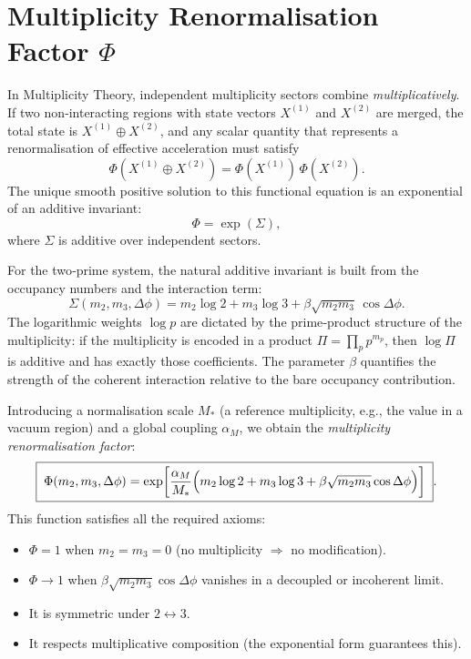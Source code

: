 \documentclass[11pt,a4paper]{article}
\theoremstyle{definition}
\theoremstyle{remark}
\begin{document}
\section{Multiplicity Renormalisation Factor $\Phi$}
In Multiplicity Theory, independent multiplicity sectors combine \textit{multiplicatively}. If two non‑interacting regions with state vectors $X^{(1)}$ and $X^{(2)}$ are merged, the total state is $X^{(1)}\oplus X^{(2)}$, and any scalar quantity that represents a renormalisation of effective acceleration must satisfy
\begin{equation}
\Phi(X^{(1)}\oplus X^{(2)}) = \Phi(X^{(1)})\,\Phi(X^{(2)}).
\label{eq:composition}
\end{equation}
The unique smooth positive solution to this functional equation is an exponential of an additive invariant:
\[
\Phi = \exp(\Sigma),
\]
where $\Sigma$ is additive over independent sectors.

For the two‑prime system, the natural additive invariant is built from the occupancy numbers and the interaction term:
\begin{equation}
\Sigma(m_2,m_3,\Delta\phi) 
= m_2\log 2 + m_3\log 3 + \beta\sqrt{m_2 m_3}\,\cos\Delta\phi.
\label{eq:Sigma}
\end{equation}
The logarithmic weights $\log p$ are dictated by the prime‑product structure of the multiplicity: if the multiplicity is encoded in a product $\Pi = \prod_p p^{m_p}$, then $\log\Pi$ is additive and has exactly those coefficients.
The parameter $\beta$ quantifies the strength of the coherent interaction relative to the bare occupancy contribution.

Introducing a normalisation scale $M_*$ (a reference multiplicity, e.g., the value in a vacuum region) and a global coupling $\alpha_M$, we obtain the \textit{multiplicity renormalisation factor}:
\begin{equation}
\boxed{\;\Phi(m_2,m_3,\Delta\phi) = 
\exp\!\left[\frac{\alpha_M}{M_*}\Bigl(m_2\log 2 + m_3\log 3 + \beta\sqrt{m_2m_3}\cos\Delta\phi\Bigr)\right]\;}.
\label{eq:Phi_final}
\end{equation}
This function satisfies all the required axioms:
\begin{itemize}
    \item $\Phi=1$ when $m_2=m_3=0$ (no multiplicity $\Rightarrow$ no modification).
    \item $\Phi\to1$ when $\beta\sqrt{m_2m_3}\cos\Delta\phi$ vanishes in a decoupled or incoherent limit.
    \item It is symmetric under $2\leftrightarrow3$.
    \item It respects multiplicative composition (the exponential form guarantees this).
\end{itemize}
\end{document}
